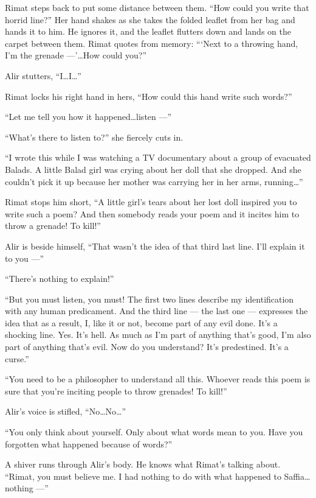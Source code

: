 \documentclass[twoside,11pt,openany]{book}
\begin{document}
Rimat steps back to put some distance between them. ``How could you write that horrid line?''
Her hand shakes as she takes the folded leaflet from her bag and hands it to him. He ignores it, and the leaflet
flutters down and lands on the carpet between them. Rimat quotes from memory:
``{\thinspace}`Next to a throwing hand,
I'm the grenade ---'{\ldots}How could you?''

Alir stutters, ``I{\ldots}I{\ldots}''

Rimat locks his right hand in hers, ``How could this hand write such words?''

``Let me tell you how it happened{\ldots}listen ---''

``What's there to listen to?'' she fiercely cuts in.

``I wrote this while I was watching a TV documentary about a group of evacuated Balads. A little Balad girl
was crying about her doll that she dropped. And she couldn't pick it up because her mother was carrying her in her
arms, running{\ldots}''

Rimat stops him short, ``A little girl's tears about her lost doll inspired you to write such a poem?  And
then somebody reads your poem and it incites him to throw a grenade! To kill!''

Alir is beside himself, ``That wasn't the idea of that third last line. I'll explain it to you ---''

``There's nothing to explain!''

``But you must listen, you must! The first two lines describe my identification with any human predicament.
And the third line --- the last one --- expresses the idea that as a result, I, like it or not, become part of any evil
done. It's a shocking line. Yes. It's hell. As much as I'm part of anything that's good, I'm also part of anything
that's evil. Now do you understand? It's predestined. It's a curse.''

``You need to be a philosopher to understand all this. Whoever reads this poem is sure that you're inciting
people to throw grenades! To kill!''

Alir's voice is stifled, ``No{\ldots}No{\ldots}''

``You only think about yourself. Only about what words mean to you. Have you forgotten what happened
because of words?''

A shiver runs through Alir's body. He knows what Rimat's talking about. ``Rimat, you must believe me. I
had nothing to do with what happened to Saffia{\ldots}nothing ---''
\end{document}
